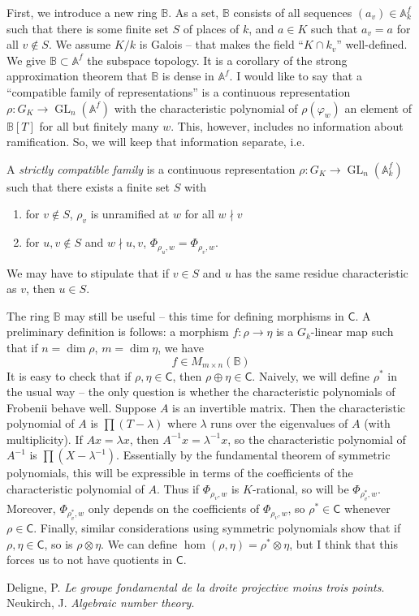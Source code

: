 \documentclass{article}
\DeclareMathOperator{\gl}{GL}
\newcommand{\dA}{\mathbb{A}}
\newcommand{\dB}{\mathbb{B}}
\newcommand{\frob}{\varphi}
\newcommand{\scomp}{\mathsf{C}}
\begin{document}
First, we introduce a new ring $\dB$. As a set, $\dB$ consists of all 
sequences $(a_v)\in \dA_k^f$ such that there is some finite set $S$ of places 
of $k$, and $a\in K$ such that $a_v=a$ for all $v\notin S$. We assume $K/k$ is 
Galois -- that makes the field ``$K\cap k_v$'' well-defined. We give 
$\dB\subset \dA^f$ the subspace topology. It is a corollary of the strong 
approximation theorem \cite[III.1, ex.1]{Neu} that $\dB$ is dense in $\dA^f$. 
I would like to say that a ``compatible family of representations'' is a 
continuous representation $\rho:G_K\to \gl_n(\dA^f)$ with the characteristic 
polynomial of $\rho(\frob_w)$ an element of $\dB[T]$ for all but finitely 
many $w$. This, however, includes no information about ramification. So, we 
will keep that information separate, i.e. 

A \emph{strictly compatible family} is a continuous representation 
$\rho:G_K\to \gl_n(\dA_k^f)$ such that there exists a finite set $S$ with 
\begin{enumerate}
  \item for $v\notin S$, $\rho_v$ is unramified at $w$ for all $w\nmid v$ 
  \item for $u,v\notin S$ and $w\nmid u,v$, $\Phi_{\rho_u,w}=\Phi_{\rho_v,w}$. 
\end{enumerate}
We may have to stipulate that if $v\in S$ and $u$ has the same residue 
characteristic as $v$, then $u\in S$. 

The ring $\dB$ may still be useful -- this time for defining morphisms 
in $\scomp$. A preliminary definition is follows: a morphism $f:\rho\to\eta$ 
is a $G_k$-linear map such that if $n=\dim \rho$, $m=\dim\eta$, we have 
\[
  f\in M_{m\times n}(\dB)
\]
It is easy to check that if $\rho,\eta\in \scomp$, then 
$\rho\oplus\eta\in \scomp$. Naively, we will define $\rho^*$ in the usual way 
-- the only question is whether the characteristic polynomials of Frobenii 
behave well. Suppose $A$ is an invertible matrix. Then the characteristic 
polynomial of $A$ is $\prod (T-\lambda)$ where $\lambda$ runs over the 
eigenvalues of $A$ (with multiplicity). If $Ax=\lambda x$, then 
$A^{-1} x = \lambda^{-1} x$, so the characteristic polynomial of 
$A^{-1}$ is $\prod (X-\lambda^{-1})$. Essentially by the fundamental theorem 
of symmetric polynomials, this will be expressible in terms of the 
coefficients of the characteristic polynomial of $A$. Thus if 
$\Phi_{\rho_v,w}$ is $K$-rational, so will be $\Phi_{\rho_v^*,w}$. Moreover, 
$\Phi_{\rho_v^*,w}$ only depends on the coefficients of $\Phi_{\rho_v,w}$, so 
$\rho^*\in \scomp$ whenever $\rho\in\scomp$. Finally, similar considerations 
using symmetric polynomials show that if $\rho,\eta\in \scomp$, so is 
$\rho\otimes\eta$. We can define $\hom(\rho,\eta)=\rho^*\otimes\eta$, but I 
think that this forces us to not have quotients in $\scomp$.





\begin{thebibliography}{9}
   Deligne, P. \emph{Le groupe fondamental de la droite 
    projective moins trois points}. 
   Neukirch, J. \emph{Algebraic number theory}. 
\end{thebibliography}
\end{document}
